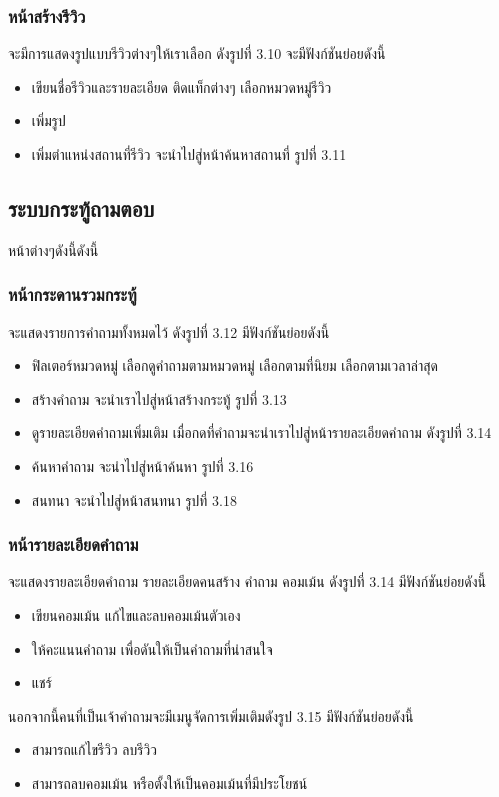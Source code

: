 \subsubsection{หน้าสร้างรีวิว}
จะมีการแสดงรูปแบบรีวิวต่างๆให้เราเลือก ดังรูปที่ 3.10  จะมีฟังก์ชันย่อยดังนี้
\begin{itemize}
  \item เขียนชื่อรีวิวและรายละเอียด ติดแท็กต่างๆ เลือกหมวดหมู่รีวิว
  \item เพิ่มรูป
  \item เพิ่มตำแหน่งสถานที่รีวิว จะนำไปสู่หน้าค้นหาสถานที่ รูปที่ 3.11
 \end{itemize}


\subsection{ระบบกระทู้ถามตอบ}
หน้าต่างๆดังนี้ดังนี้
\subsubsection{หน้ากระดานรวมกระทู้}
จะแสดงรายการคำถามทั้งหมดไว้ ดังรูปที่ 3.12 มีฟังก์ชันย่อยดังนี้
\begin{itemize}
  \item ฟิลเตอร์หมวดหมู่ เลือกดูคำถามตามหมวดหมู่ เลือกตามที่นิยม เลือกตามเวลาล่าสุด 
  \item สร้างคำถาม จะนำเราไปสู่หน้าสร้างกระทู้ รูปที่ 3.13
  \item ดูรายละเอียดคำถามเพิ่มเติม เมื่อกดที่คำถามจะนำเราไปสู่หน้ารายละเอียดคำถาม ดังรูปที่ 3.14
  \item ค้นหาคำถาม จะนำไปสู่หน้าค้นหา รูปที่ 3.16
  \item สนทนา จะนำไปสู่หน้าสนทนา รูปที่ 3.18
 \end{itemize}


\subsubsection{หน้ารายละเอียดคำถาม}
จะแสดงรายละเอียดคำถาม รายละเอียดคนสร้าง คำถาม คอมเม้น ดังรูปที่ 3.14 มีฟังก์ชันย่อยดังนี้
\begin{itemize}
  \item เขียนคอมเม้น แก้ไขและลบคอมเม้นตัวเอง
  \item ให้คะแนนคำถาม เพื่อดันให้เป็นคำถามที่น่าสนใจ
  \item แชร์
 \end{itemize}
 นอกจากนี้คนที่เป็นเจ้าคำถามจะมีเมนูจัดการเพิ่มเติมดังรูป 3.15 มีฟังก์ชันย่อยดังนี้
 \begin{itemize}
   \item สามารถแก้ไขรีวิว ลบรีวิว
   \item สามารถลบคอมเม้น หรือตั้งให้เป็นคอมเม้นที่มีประโยชน์
  \end{itemize}

